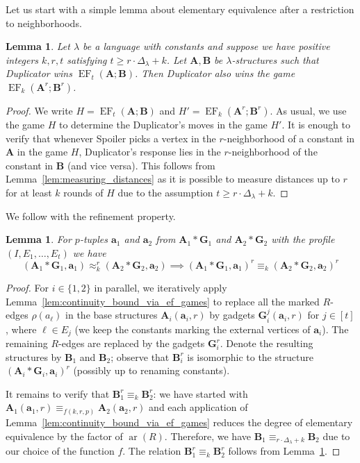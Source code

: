 \documentclass[11pt]{article}
\theoremstyle{plain}
\newtheorem{lemma}[theorem]{Lemma}
\theoremstyle{definition}
\theoremstyle{remark}
\DeclareMathOperator\aritysym{ar}
\newcommand{\arity}[1]{{\aritysym({#1})}}
\DeclareMathOperator{\EF}{EF}
\newcommand{\str}[1]{\mathbf{#1}}
\newcommand{\maxarity}[1]{\Delta_{#1}}
\newcommand{\tpl}[1]{{\bm{#1}}}
\begin{document}
Let us start with a simple lemma about elementary equivalence after a restriction to neighborhoods.

\begin{lemma}\label{lem:restriction_to_neighborhoods}
    Let $\lambda$ be a language with constants and suppose we have positive integers $k,r,t$ satisfying $t \geq r \cdot \maxarity{\lambda} + k$.
    Let $\str{A}, \str{B}$ be $\lambda$-structures such that Duplicator wins $\EF_t(\str{A}; \str{B})$.
    Then Duplicator also wins the game $\EF_k(\str{A}^r; \str{B}^r)$.
\end{lemma}
\begin{proof}
    We write $H = \EF_t(\str{A}; \str{B})$ and $H' = \EF_k(\str{A}^r; \str{B}^r)$.
    As usual, we use the game $H$ to determine the Duplicator's moves in the game $H'$.
    It is enough to verify that whenever Spoiler picks a vertex in the $r$-neighborhood of a constant in $\str{A}$ in the game $H$, Duplicator's response lies in the $r$-neighborhood of the constant in $\str{B}$ (and vice versa). 
    This follows from Lemma~\ref{lem:measuring_distances} as it is possible to measure distances up to $r$ for at least $k$ rounds of $H$ due to the assumption $t \geq r \cdot \maxarity{\lambda} + k$.
\end{proof}

We follow with the refinement property.

\begin{lemma}\label{lem:representation_equivalence_refines_elementary_equivalence}
    For $p$-tuples $\tpl{a}_1$ and $\tpl{a}_2$ from $\str{A}_1*\str{G}_1$ and $\str{A}_2*\str{G}_2$ with the profile $(I,E_1, \dots, E_t)$ we have
    \[
        (\str{A}_1*\str{G}_1, \tpl{a}_1) \approx_k^r (\str{A}_2*\str{G}_2, \tpl{a}_2)
        \implies
        (\str{A}_1 * \str{G}_1, \tpl{a}_1)^r \equiv_k (\str{A}_2 * \str{G}_2, \tpl{a}_2)^r
    \]
\end{lemma}
\begin{proof}
    For $i \in \{1,2\}$ in parallel, we iteratively apply Lemma~\ref{lem:continuity_bound_via_ef_games} to replace all the marked $R$-edges $\rho(a_\ell)$ in the base structures $\str{A}_i(\tpl{a}_i, r)$ by gadgets $\str{G}_i^j(\tpl{a}_i, r)$ for $j \in [t]$, where $\ell \in E_j$ (we keep the constants marking the external vertices of $\tpl{a}_i$).
    The remaining $R$-edges are replaced by the gadgets $\str{G}_i^r$.
    Denote the resulting structures by $\str{B}_1$ and $\str{B}_2$; observe that $\str{B}_i^r$ is isomorphic to the structure $(\str{A}_i*\str{G}_i, \tpl{a}_i)^r$ (possibly up to renaming constants).
    
    It remains to verify that $\str{B}_1^r \equiv_k \str{B}_2^r$: 
    we have started with $\str{A}_1(\tpl{a}_1, r) \equiv_{f(k,r,p)} \str{A}_2(\tpl{a}_2, r)$ and each application of Lemma~\ref{lem:continuity_bound_via_ef_games} reduces the degree of elementary equivalence by the factor of $\arity{R}$.
    Therefore, we have $\str{B}_1 \equiv_{r \cdot \maxarity{\lambda} + k} \str{B}_2$ due to our choice of the function $f$.
    The relation $\str{B}_1^r \equiv_k \str{B}_2^r$ follows from Lemma~\ref{lem:restriction_to_neighborhoods}.
\end{proof}
\end{document}
